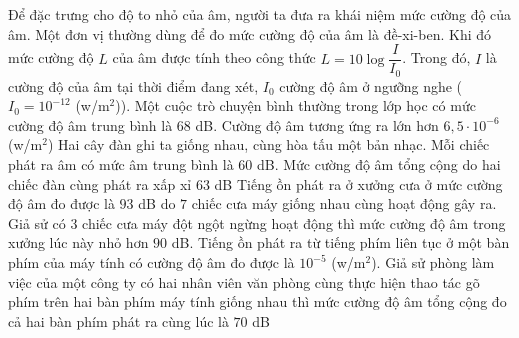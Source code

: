 \begin{ex}%
 Để đặc trưng cho độ to nhỏ của âm, người ta đưa ra khái niệm mức cường độ của âm. Một đơn vị thường dùng để đo mức cường độ của âm là đề-xi-ben. Khi đó mức cường độ  $L$ của âm được tính theo công thức $L=10\log \dfrac{I}{I_0}$. Trong đó, $I$ là cường độ của âm tại thời điểm đang xét, $I_0$ cường độ âm ở ngưỡng nghe ($I_0=10^{-12}$ (w/m$^2$)).
 \choiceTF 
  {Một cuộc trò chuyện bình thường  trong lớp học có mức cường độ âm trung bình là $68$ dB. Cường độ âm tương ứng ra lớn hơn $6{,}5\cdot 10^{-6}$ (w/m$^2$)}
  {\True Hai cây đàn ghi ta giống nhau, cùng hòa tấu một bản nhạc.  Mỗi chiếc phát ra âm có mức âm trung bình là $60$ dB. Mức cường độ âm tổng cộng do hai chiếc đàn cùng phát ra xấp xỉ $63$ dB}
  {Tiếng ồn phát ra ở xưởng cưa ở mức cường độ âm đo được là $93$ dB do $7$ chiếc cưa máy giống nhau  cùng hoạt động gây ra. Giả sử có $3$ chiếc cưa máy đột ngột ngừng hoạt động thì mức cường độ âm trong xưởng lúc này nhỏ hơn $90$ dB. }
  {Tiếng ồn phát ra từ tiếng phím liên tục ở một bàn phím  của máy tính có cường độ âm đo được là $10^{-5}$ (w/m$^2$). Giả sử phòng làm việc của một công ty có hai nhân viên văn phòng cùng thực hiện thao tác gõ phím trên hai bàn phím máy tính giống nhau thì mức cường độ âm tổng cộng đo cả hai bàn phím phát ra cùng lúc là $70$ dB}
\end{ex}

